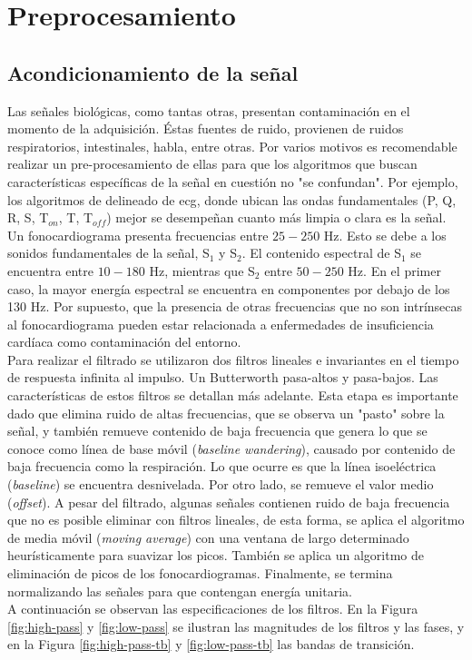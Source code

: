 \chapter{Preprocesamiento}

\section{Acondicionamiento de la señal}

Las señales biológicas, como tantas otras, presentan contaminación en el momento de la adquisición. Éstas fuentes de
ruido, provienen de ruidos respiratorios, intestinales, habla, entre otras.
Por varios motivos es recomendable realizar un pre-procesamiento de ellas para que los algoritmos que buscan
características específicas de la señal en cuestión no "se confundan".
Por ejemplo, los algoritmos de delineado de \acrshort{ecg},
donde ubican las ondas fundamentales (P, Q, R, S, T$_{on}$, T, T$_{off}$) mejor se desempeñan cuanto más limpia o
clara es la señal. \\
\indent Un fonocardiograma presenta frecuencias entre $25-250$ Hz. Esto se debe a los sonidos fundamentales de la
señal, S$_1$ y S$_2$. El contenido espectral de S$_1$ se encuentra entre $10-180$ Hz, mientras que S$_2$ entre
$50-250$ Hz. En el primer caso, la mayor energía espectral se encuentra en componentes por debajo de los 130 Hz. Por
supuesto, que la presencia de otras frecuencias que no son intrínsecas al fonocardiograma pueden estar relacionada a
enfermedades de insuficiencia cardíaca como contaminación del entorno. \\
\indent Para realizar el filtrado se utilizaron dos filtros lineales e invariantes en el tiempo de respuesta
infinita al impulso.
Un Butterworth pasa-altos y pasa-bajos. Las características de estos filtros se detallan más adelante.
Esta etapa es importante dado que elimina ruido de altas frecuencias, que se observa un "pasto" sobre la señal,
y también remueve contenido de baja frecuencia que genera lo que se conoce como línea de base móvil
(\textit{baseline wandering}), causado por contenido de baja frecuencia como la respiración.
Lo que ocurre es que la línea isoeléctrica (\textit{baseline}) se encuentra desnivelada.
Por otro lado, se remueve el valor medio (\textit{offset}).
A pesar del filtrado, algunas señales contienen ruido de baja frecuencia que no es posible eliminar con filtros
lineales, de esta forma, se aplica el algoritmo de media móvil (\textit{moving average}) con una ventana de largo
determinado heurísticamente para suavizar los picos.
También se aplica un algoritmo de eliminación de picos de los fonocardiogramas.
Finalmente, se termina normalizando las señales para que contengan energía unitaria. \\
\indent A continuación se observan las especificaciones de los filtros.
En la Figura \ref{fig:high-pass} y \ref{fig:low-pass} se ilustran las magnitudes de los filtros y las fases,
y en la Figura \ref{fig:high-pass-tb} y \ref{fig:low-pass-tb} las bandas de transición.

